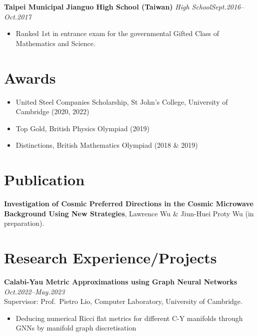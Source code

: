 \documentclass[11pt,a4paper,roman]{moderncv}        %
\begin{document}
\textbf{Taipei Municipal Jianguo High School (Taiwan)} \textit{High School}\hfill \textit{Sept.2016--Oct.2017}
\vspace*{1mm}
\begin{itemize}
\item{Ranked 1st in entrance exam for the governmental Gifted Class of Mathematics and Science.}
\end{itemize}

\section{Awards}
\begin{itemize}
	\item United Steel Companies Scholarship, St John's College, University of Cambridge (2020, 2022)
	\item Top Gold, British Physics Olympiad (2019)
	\item Distinctions, British Mathematics Olympiad (2018 \& 2019)
\end{itemize}


\section{Publication}
\textbf{Investigation of Cosmic Preferred Directions in the Cosmic Microwave Background Using New Strategies}, Lawrence Wu \& Jiun-Huei Proty Wu (in preparation).

\section{Research Experience/Projects}

\textbf{Calabi-Yau Metric Approximations using Graph Neural Networks} \hfill \textit{Oct.2022--May.2023}
\vspace*{1mm}\\
{Supervisor: Prof.\ Pietro Lio, Computer Laboratory, University of Cambridge.}
\vspace*{1mm}
\begin{itemize}
	\item Deducing numerical Ricci flat metrics for different C-Y manifolds through GNNs by manifold graph discretisation\\
\end{itemize}
\end{document}
